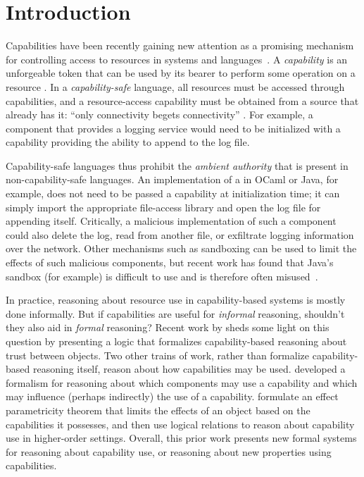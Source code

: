 \section{Introduction}

Capabilities have been recently gaining new attention as a promising mechanism for controlling access to resources in systems and languages~\cite{miller03,drossopoulou07,dimoulas14,devriese16}.
A \textit{capability} is an unforgeable token that can be used by its bearer to perform some operation on a resource \cite{dennis66}.
In a \textit{capability-safe} language, all resources must be accessed through capabilities, and a resource-access capability must be obtained from a source that already has it: ``only connectivity begets connectivity'' \cite{miller03}.
For example, a  component that provides a logging service would need to be initialized with a capability providing the ability to append to the log file.

Capability-safe languages thus prohibit the \textit{ambient authority} that is present in non-capability-safe languages.
An implementation of a  in OCaml or Java, for example, does not need to be passed a capability at initialization time; it can simply import the appropriate file-access library and open the log file for appending itself.
Critically, a malicious implementation of such a component could also delete the log, read from another file, or exfiltrate logging information over the network.
Other mechanisms such as sandboxing can be used to limit the effects of such malicious components, but recent work has found that Java's sandbox (for example) is difficult to use and is therefore often misused~\cite{coker15, maass16}.

In practice, reasoning about resource use in capability-based systems is mostly done informally.
But if capabilities are useful for \textit{informal} reasoning, shouldn't they also aid in \textit{formal} reasoning?
Recent work by \citet{drossopoulou07} sheds some light on this question by presenting a logic that formalizes capability-based reasoning about trust between objects.
Two other trains of work, rather than formalize capability-based reasoning itself, reason about how capabilities may be used.
\citet{dimoulas14} developed a formalism for reasoning about which components may use a capability and which may influence (perhaps indirectly) the use of a capability.
\citet{devriese16} formulate an effect parametricity theorem that limits the effects of an object based on the capabilities it possesses, and then use logical relations to reason about capability use in higher-order settings.
Overall, this prior work presents new formal systems for reasoning about capability use, or reasoning about new properties using capabilities.

